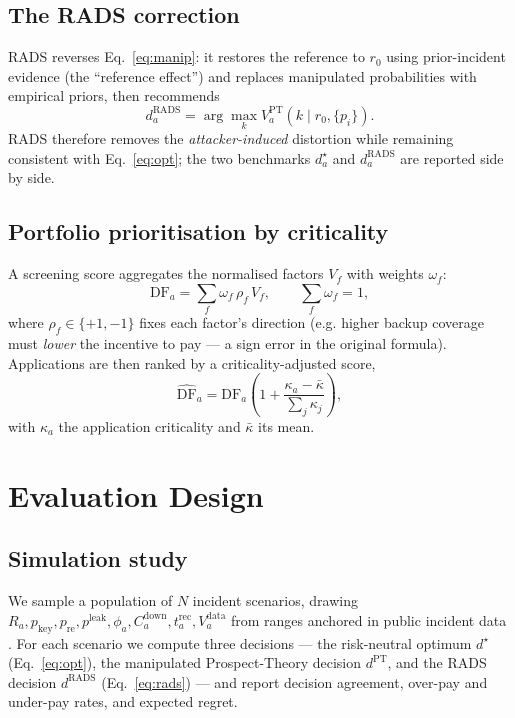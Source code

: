 \documentclass[jcp,article,submit,pdftex,moreauthors]{Definitions/mdpi}
\begin{document}
\subsection{The RADS correction}
RADS reverses Eq.~\eqref{eq:manip}: it restores the reference to $r_0$ using
prior-incident evidence (the ``reference effect'') and replaces manipulated
probabilities with empirical priors, then recommends
\begin{equation}\label{eq:rads}
d_a^{\mathrm{RADS}}=\arg\max_k V_a^{\mathrm{PT}}\!\left(k \mid r_0,\{p_i\}\right).
\end{equation}
RADS therefore removes the \emph{attacker-induced} distortion while remaining
consistent with Eq.~\eqref{eq:opt}; the two benchmarks $d_a^{\star}$ and
$d_a^{\mathrm{RADS}}$ are reported side by side.

\subsection{Portfolio prioritisation by criticality}
A screening score aggregates the normalised factors $V_f$ with weights
$\omega_f$:
\begin{equation}\label{eq:df}
\mathrm{DF}_a=\sum_{f}\omega_f\,\rho_f\,V_f,\qquad \sum_f\omega_f=1,
\end{equation}
where $\rho_f\in\{+1,-1\}$ fixes each factor's direction (e.g. higher backup
coverage must \emph{lower} the incentive to pay --- a sign error in the original
formula). Applications are then ranked by a criticality-adjusted score,
\begin{equation}\label{eq:adj}
\widehat{\mathrm{DF}}_a=\mathrm{DF}_a\left(1+\frac{\kappa_a-\bar\kappa}{\sum_j \kappa_j}\right),
\end{equation}
with $\kappa_a$ the application criticality and $\bar\kappa$ its mean.

\section{Evaluation Design}\label{sec:eval}

\subsection{Simulation study}
We sample a population of $N$ incident scenarios, drawing
$R_a, p_{\mathrm{key}}, p_{\mathrm{re}}, p^{\mathrm{leak}}, \phi_a, C^{\mathrm{down}}_a,
t^{\mathrm{rec}}_a, V^{\mathrm{data}}_a$ from ranges anchored in public incident
data \cite{bib_coveware,bib_sophos,bib_ibmcost,bib_enisa}. For each scenario we
compute three decisions --- the risk-neutral optimum $d^{\star}$
(Eq.~\eqref{eq:opt}), the manipulated Prospect-Theory decision $d^{\mathrm{PT}}$,
and the RADS decision $d^{\mathrm{RADS}}$ (Eq.~\eqref{eq:rads}) --- and report
decision agreement, over-pay and under-pay rates, and expected regret.
\end{document}

